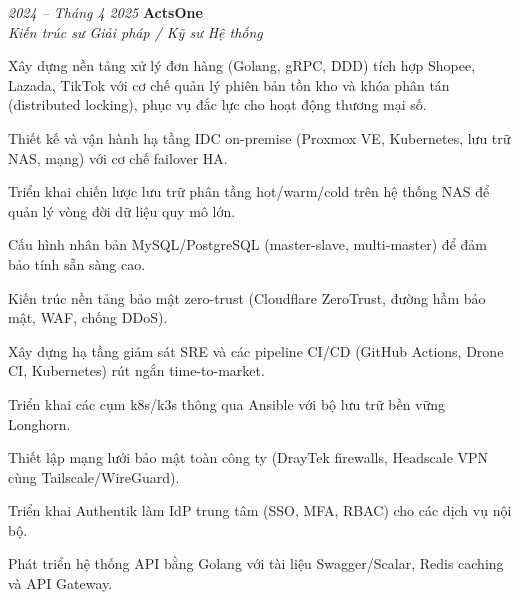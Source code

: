 \begin{twocolentry}{\textit{2024 -- Tháng 4 2025}}
    \textbf{ActsOne} \\[4pt]
    \textit{Kiến trúc sư Giải pháp / Kỹ sư Hệ thống}
\end{twocolentry}
\begin{onecolentry}
    \begin{highlights}
        \item Xây dựng nền tảng xử lý đơn hàng (Golang, gRPC, DDD) tích hợp Shopee, Lazada, TikTok với cơ chế quản lý phiên bản tồn kho và khóa phân tán (distributed locking), phục vụ đắc lực cho hoạt động thương mại số.
        \item Thiết kế và vận hành hạ tầng IDC on-premise (Proxmox VE, Kubernetes, lưu trữ NAS, mạng) với cơ chế failover HA.
        \item Triển khai chiến lược lưu trữ phân tầng hot/warm/cold trên hệ thống NAS để quản lý vòng đời dữ liệu quy mô lớn.
        \item Cấu hình nhân bản MySQL/PostgreSQL (master-slave, multi-master) để đảm bảo tính sẵn sàng cao.
        \item Kiến trúc nền tảng bảo mật zero-trust (Cloudflare ZeroTrust, đường hầm bảo mật, WAF, chống DDoS).
        \item Xây dựng hạ tầng giám sát SRE và các pipeline CI/CD (GitHub Actions, Drone CI, Kubernetes) rút ngắn time-to-market.
        \item Triển khai các cụm k8s/k3s thông qua Ansible với bộ lưu trữ bền vững Longhorn.
        \item Thiết lập mạng lưới bảo mật toàn công ty (DrayTek firewalls, Headscale VPN cùng Tailscale/WireGuard).
        \item Triển khai Authentik làm IdP trung tâm (SSO, MFA, RBAC) cho các dịch vụ nội bộ.
        \item Phát triển hệ thống API bằng Golang với tài liệu Swagger/Scalar, Redis caching và API Gateway.
    \end{highlights}
\end{onecolentry}
\vspace{0.2 cm}

